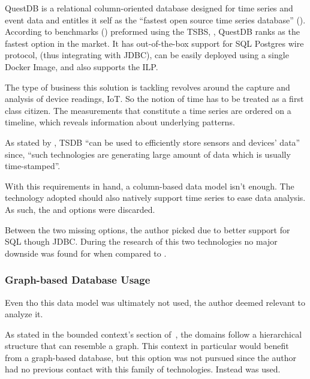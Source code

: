QuestDB is a relational column-oriented database designed for time series and event data and entitles it self as the ``fastest open source time series database'' (\cite{questdb}).
According to benchmarks (\cite{quest-bench}) preformed using the \gls{TSBS}, \cite{TSBS}, QuestDB ranks as the fastest option in the market.
It has out-of-the-box support for SQL Postgres wire protocol, (thus integrating with \gls{JDBC}), can be easily deployed using a single Docker Image, and also supports the \gls{ILP}.

The type of business this solution is tackling revolves around the capture and analysis of device readings, \gls{IoT}. So the notion of time has to be treated as a first class citizen. The measurements that constitute a time series are ordered on a timeline, which reveals information about underlying patterns.

As stated by \cite{naqvi2017time}, \gls{TSDB} ``can be used to efficiently store sensors and devices' data'' since, ``such technologies are generating large amount of data which is usually time-stamped''.

With this requirements in hand, a column-based data model isn't enough. The technology adopted should also natively support time series to ease data analysis. As such, the  and  options were discarded.

Between the two missing options, the author picked  due to better support for \gls{SQL} though \gls{JDBC}. During the research of this two technologies no major downside was found for  when compared to .

\subsubsection{Graph-based Database Usage}
\label{subsubsec:implementation:decisions:database:identity}

Even tho this data model was ultimately not used, the author deemed relevant to analyze it.

As stated in the bounded context's section of~, the domains follow a hierarchical structure that can resemble a graph. This context in particular would benefit from a  graph-based database, but this option was not pursued since the author had no previous contact with this family of technologies. Instead  was used.

